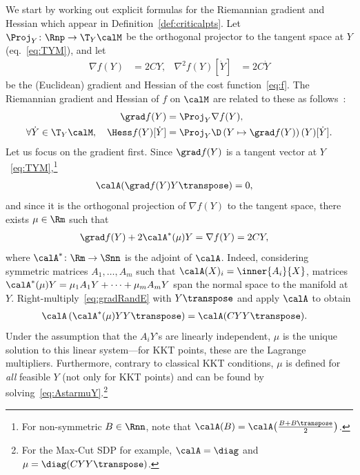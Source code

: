 \documentclass{article}
\newcommand{\1}{\mathbf{1}}
\begin{document}
We start by working out explicit formulas for the Riemannian gradient and Hessian which appear in Definition~\ref{def:criticalpts}. Let $\Proj_Y \colon \Rnp \to \T_Y\calM$ be the orthogonal projector to the tangent space at $Y$ (eq.~\eqref{eq:TYM}), and let
\begin{align}
\nabla f(Y) & = 2CY, & \nabla^2 f(Y)[\dot Y] & = 2C\dot Y
\end{align}
be the (Euclidean) gradient and Hessian of the cost function~\eqref{eq:f}. The Riemannian gradient and Hessian of $f$ on $\calM$ are related to these as follows~\citep[see][eqs\,(3.37),~(5.15)]{AMS08}:
\begin{align}
\grad f(Y) & = \Proj_Y \nabla f(Y), \\ %
\forall \dot Y \in \T_Y\calM, \quad \Hess f(Y)[\dot Y] & = \Proj_Y \D\left( Y \mapsto \grad f(Y) \right)(Y)[\dot Y].
\label{eq:RiemannianHessian}
\end{align}
Let us focus on the gradient first. Since $\grad f(Y)$ is a tangent vector at $Y$~\eqref{eq:TYM},\footnote{For non-symmetric $B\in\Rnn$, note that $\calA(B) = \calA\big( \frac{B+B\transpose}{2} \big)$.}
\begin{align}
\calA(\grad f(Y)Y\transpose) & = 0,
\end{align}
and since it is the orthogonal projection of $\nabla f(Y)$ to the tangent space, there exists $\mu \in \Rm$ such that
\begin{align}
\grad f(Y) + 2 \calA^*(\mu)Y & = \nabla f(Y) = 2CY,
\label{eq:gradRandE}
\end{align}
where $\calA^* \colon \Rm \to \Snn$ is the adjoint of $\calA$. Indeed, considering symmetric matrices $A_1, \ldots, A_m$ such that $\calA(X)_i = \inner{A_i}{X}$, matrices $\calA^*(\mu)Y = \mu_1 A_1Y + \cdots + \mu_m A_mY$ span the normal space to the manifold at $Y$. Right-multiply~\eqref{eq:gradRandE} with $Y\transpose$ and apply $\calA$ to obtain
\begin{align}
\calA\left(\calA^*(\mu)YY\transpose\right) & = \calA(CYY\transpose).
\label{eq:AstarmuY}
\end{align}
Under the assumption that the $A_iY$'s are linearly independent, $\mu$ is the unique solution to this linear system---for KKT points, these are the Lagrange multipliers.
Furthermore, contrary to classical KKT conditions, $\mu$ is defined for \emph{all} feasible $Y$ (not only for KKT points) and can be found by solving~\eqref{eq:AstarmuY}.\footnote{For the Max-Cut SDP for example, $\calA = \diag$ and $\mu = \diag(CYY\transpose)$.}
\end{document}
